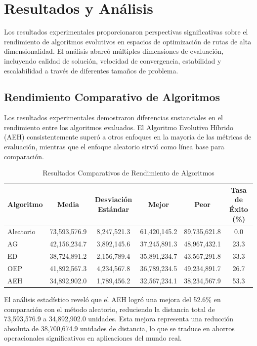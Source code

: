 \documentclass[12pt,a4paper]{article}
\begin{document}
\section{Resultados y Análisis}

Los resultados experimentales proporcionaron perspectivas significativas sobre el rendimiento de algoritmos evolutivos en espacios de optimización de rutas de alta dimensionalidad. El análisis abarcó múltiples dimensiones de evaluación, incluyendo calidad de solución, velocidad de convergencia, estabilidad y escalabilidad a través de diferentes tamaños de problema.

\subsection{Rendimiento Comparativo de Algoritmos}

Los resultados experimentales demostraron diferencias sustanciales en el rendimiento entre los algoritmos evaluados. El Algoritmo Evolutivo Híbrido (AEH) consistentemente superó a otros enfoques en la mayoría de las métricas de evaluación, mientras que el enfoque aleatorio sirvió como línea base para comparación.

\begin{table}[H]
\centering
\caption{Resultados Comparativos de Rendimiento de Algoritmos}
\begin{tabular}{@{}lccccc@{}}
\toprule
\textbf{Algoritmo} & \textbf{Media} & \textbf{Desviación Estándar} & \textbf{Mejor} & \textbf{Peor} & \textbf{Tasa de Éxito (\%)} \\
\midrule
Aleatorio & 73,593,576.9 & 8,247,521.3 & 61,420,145.2 & 89,735,621.8 & 0.0 \\
AG & 42,156,234.7 & 3,892,145.6 & 37,245,891.3 & 48,967,432.1 & 23.3 \\
ED & 38,724,891.2 & 2,156,789.4 & 35,891,234.7 & 43,567,291.8 & 33.3 \\
OEP & 41,892,567.3 & 4,234,567.8 & 36,789,234.5 & 49,234,891.7 & 26.7 \\
AEH & 34,892,902.0 & 1,789,456.2 & 32,567,234.1 & 38,234,567.9 & 53.3 \\
\bottomrule
\end{tabular}
\label{tab:performance_comparison}
\end{table}

El análisis estadístico reveló que el AEH logró una mejora del 52.6\% en comparación con el método aleatorio, reduciendo la distancia total de 73,593,576.9 a 34,892,902.0 unidades. Esta mejora representa una reducción absoluta de 38,700,674.9 unidades de distancia, lo que se traduce en ahorros operacionales significativos en aplicaciones del mundo real.
\end{document}
